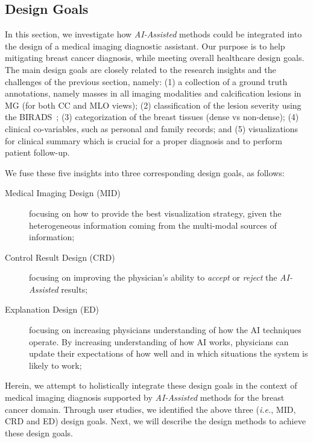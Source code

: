 \subsection{Design Goals}
\label{sec:goals}

In this section, we investigate how {\it AI-Assisted} methods could be integrated into the design of a medical imaging diagnostic assistant.
Our purpose is to help mitigating breast cancer diagnosis, while meeting overall healthcare design goals.
The main design goals are closely related to the research insights and the challenges of the previous section, namely:
(1) a collection of a ground truth annotations, namely masses in all imaging modalities and calcification lesions in MG (for both CC and MLO views);
(2) classification of the lesion severity using the BIRADS~\cite{aghaei2018association};
(3) categorization of the breast tissues (dense vs non-dense);
(4) clinical co-varia\-bles, such as personal and family records; and
(5) visualizations for clinical summary which is crucial for a proper diagnosis and to perform patient follow-up.

\hfill

\noindent
We fuse these five insights into three corresponding design goals, as follows:

\hfill

\begin{description}
\item[Medical Imaging Design (MID)] focusing on how to provide the best visualization strategy, given the heterogeneous information coming from the multi-modal sources of information;

\item[Control Result Design (CRD)] focusing on improving the physician's ability to {\it accept} or {\it reject} the {\it AI-Assisted} results;

\item[Explanation Design (ED)] focusing on increasing physicians understanding of how the AI techniques operate. By increasing understanding of how AI works, physicians can update their expectations of how well and in which situations the system is likely to work;
\end{description}

\hfill

Herein, we  attempt to holistically integrate these design goals in the context of medical imaging diagnosis supported by {\it AI-Assisted} methods for the breast cancer domain.
Through user studies, we identified the above three ({\it i.e.}, MID, CRD and ED) design goals.
Next, we will describe the design methods to achieve these design goals.

